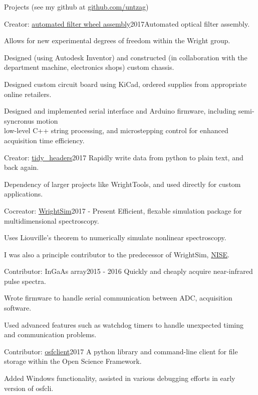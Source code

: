 \documentclass{resume}  %
\begin{document}
\begin{rSection}{Projects (\MakeLowercase{see my github at}
    \href{https://github.com/untzag}{\MakeLowercase{github.com/untzag}})}
\begin{rSubsection}{Creator: \href{https://github.com/wright-group/FilterWheels}{automated filter
        wheel assembly}}{2017}{Automated optical filter assembly.}{}
    \item Allows for new experimental degrees of freedom within the Wright group.
    \item Designed (using Autodesk Inventor) and constructed (in collaboration with the department
      machine, electronics shops) custom chassis.
    \item Designed custom circuit board using KiCad, ordered supplies from appropriate online
      retailers.
    \item Designed and implemented serial interface and Arduino firmware, including semi-syncronus
      motion \\ low-level C++ string processing, and microstepping control for enhanced acquisition
      time efficiency.
  \end{rSubsection}
  \begin{rSubsection}{Creator: \href{https://github.com/untzag/tidy_headers}{tidy\_headers}}{2017}
    {Rapidly write data from python to plain text, and back again.}{}
    \item Dependency of larger projects like WrightTools, and used directly for custom
      applications.
  \end{rSubsection}
  \begin{rSubsection}{Cocreator: \href{https://github.com/wright-group/WrightSim}{WrightSim}}{2017 -
      Present}
    {Efficient, flexable simulation package for multidimensional spectroscopy.}{}
    \item Uses Liouville's theorem to numerically simulate nonlinear spectroscopy.
    \item I was also a principle contributor to the predecessor of WrightSim,
      \href{https://github.com/wright-group/NISE}{NISE}.
  \end{rSubsection}
  \begin{rSubsection}{Contributor: InGaAs array}{2015 - 2016}
    {Quickly and cheaply acquire near-infrared pulse spectra.}{}
    \item Wrote firmware to handle serial communication between ADC, acquisition software.
    \item Used advanced features such as watchdog timers to handle unexpected timing and
      communication problems.
  \end{rSubsection}
  \begin{rSubsection}{Contributor: \href{https://github.com/dib-lab/osf-cli}{osfclient}}{2017}
    {A python library and command-line client for file storage within the Open Science Framework.}{}
    \item Added Windows functionality, assisted in various debugging efforts in early version of
      osfcli.
  \end{rSubsection}
\end{rSection}
\end{document}
